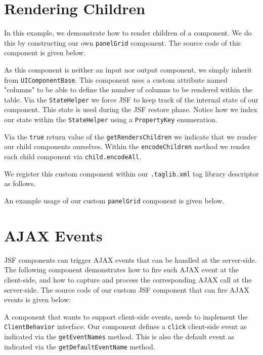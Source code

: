 \section{Rendering Children}
In this example, we demonstrate how to render children of a component.
We do this by constructing our own \texttt{panelGrid} component.
The source code of this component is given below.

As this component is neither an input nor output component, we simply inherit from \texttt{UIComponentBase}.
This component uses a custom attribute named "columns" to be able to define the number of columns to be rendered within the table.
Via the \texttt{StateHelper} we force JSF to keep track of the internal state of our component.
This state is used during the JSF restore phase.
Notice how we index our state within the \texttt{StateHelper} using a \texttt{PropertyKey} enumeration.

Via the \texttt{true} return value of the \texttt{getRendersChildren} we indicate that we render our child components ourselves.
Within the \texttt{encodeChildren} method we render each child component via \texttt{child.encodeAll}.

We register this custom component within our \texttt{.taglib.xml} tag library descriptor as follows.


An example usage of our custom \texttt{panelGrid} component is given below.



\section{AJAX Events}
JSF components can trigger AJAX events that can be handled at the server-side.
The following component demonstrates how to fire such AJAX event at the client-side, and how to capture and process the corresponding AJAX call at the server-side.
The source code of our custom JSF component that can fire AJAX events is given below:

A component that wants to support client-side events, needs to implement the \texttt{ClientBehavior} interface.
Our component defines a \texttt{click} client-side event as indicated via the \texttt{getEventNames} method.
This is also the default event as indicated via the \texttt{getDefaultEventName} method.

